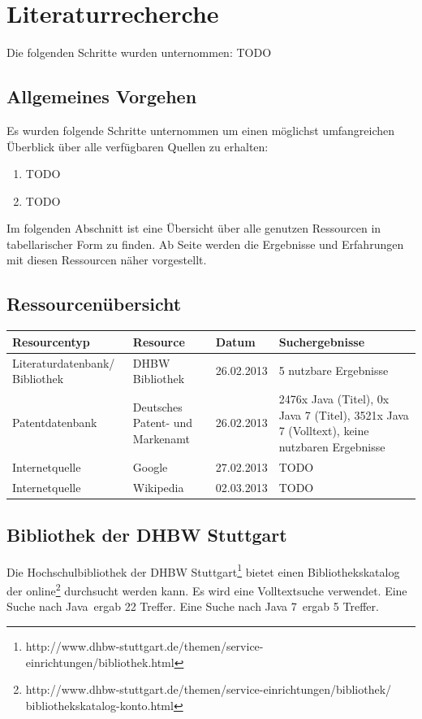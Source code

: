 \section{Literaturrecherche}
Die folgenden Schritte wurden unternommen: TODO

\subsection{Allgemeines Vorgehen}

Es wurden folgende Schritte unternommen um einen möglichst umfangreichen Überblick über alle verfügbaren Quellen zu erhalten:
\begin{enumerate}
\item TODO
\item TODO
\end{enumerate}
Im folgenden Abschnitt ist eine Übersicht über alle genutzen Ressourcen in tabellarischer Form zu finden. Ab Seite \pageref{startdetails} werden die Ergebnisse und Erfahrungen mit diesen Ressourcen näher vorgestellt.

\subsection{Ressourcenübersicht}


\renewcommand{\arraystretch}{1.5}
\begin{table}[htp]
\centering
\begin{tabular}{p{3.6cm}|p{3.5cm}|l|p{3.5cm}}
Resourcentyp & Resource & Datum & Suchergebnisse\\
\hline
Literaturdatenbank/ Bibliothek & DHBW Bibliothek & 26.02.2013 & 5 nutzbare Ergebnisse\\
Patentdatenbank & Deutsches Patent- und Markenamt & 26.02.2013 & 2476x Java (Titel), 0x Java 7 (Titel), 3521x Java 7 (Volltext), keine nutzbaren Ergebnisse\\
Internetquelle & Google & 27.02.2013 & TODO\\
Internetquelle & Wikipedia & 02.03.2013 & TODO\\
\end{tabular}
\end{table}
\renewcommand{\arraystretch}{1}

\label{startdetails}
\subsection{Bibliothek der DHBW Stuttgart}
Die Hochschulbibliothek der DHBW Stuttgart\footnote{http://www.dhbw-stuttgart.de/themen/service-einrichtungen/bibliothek.html} bietet einen Bibliothekskatalog der online\footnote{http://www.dhbw-stuttgart.de/themen/service-einrichtungen/bibliothek/\\bibliothekskatalog-konto.html} durchsucht werden kann. Es wird eine Volltextsuche verwendet. Eine Suche nach \glqq Java\grqq ~ergab 22 Treffer. Eine Suche nach \glqq Java 7\grqq ~ergab 5 Treffer.

